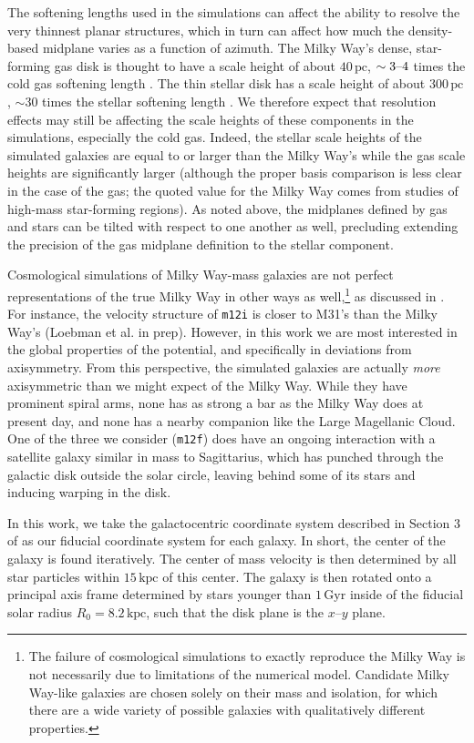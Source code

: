 \documentclass[twocolumn]{aastex62}
\newcommand{\pc}{\text{pc}}
\newcommand{\kpc}{\text{kpc}}
\newcommand{\Gyr}{\text{Gyr}}
\newcommand{\mi}{\texttt{m12i}}
\newcommand{\mf}{\texttt{m12f}}
\begin{document}
The softening lengths used in the simulations can affect the ability to
resolve the very thinnest planar structures, which in turn can affect how much
the density-based midplane varies as a function of azimuth. The Milky Way's
dense, star-forming gas disk is thought to have a scale height of about
$40\,\pc$, $\sim3\textup{--}4$ times the cold gas softening length
\citep{2019ApJ...871..145A}. The thin stellar disk has a scale height of about
$300\,\pc$, $\sim30$ times the stellar softening length
\citep{2008ApJ...673..864J}. We therefore expect that resolution effects may
still be affecting the scale heights of these components in the simulations,
especially the cold gas. Indeed, the stellar scale heights of the simulated
galaxies are equal to or larger than the Milky Way's while the gas scale
heights are significantly larger (although the proper basis comparison is less
clear in the case of the gas; the quoted value for the Milky Way comes from
studies of high-mass star-forming regions). As noted above, the midplanes
defined by gas and stars can be tilted with respect to one another as well,
precluding extending the precision of the gas midplane definition to the
stellar component.

Cosmological simulations of Milky Way-mass galaxies are not perfect
representations of the true Milky Way in other ways as well,\footnote{The
failure of cosmological simulations to exactly reproduce the Milky Way is not necessarily due to limitations of the numerical model. Candidate Milky Way-like
galaxies are chosen solely on their mass and isolation, for which there are a
wide variety of possible galaxies with qualitatively different properties.} as
discussed in \citet{2018arXiv180610564S}. For instance, the velocity structure
of \mi{} is closer to M31's than the Milky Way's (Loebman et al. in prep).
However, in this work we are most interested in the global properties of the
potential, and specifically in deviations from axisymmetry. From this
perspective, the simulated galaxies are actually \emph{more} axisymmetric than
we might expect of the Milky Way. While they have prominent spiral arms, none
has as strong a bar as the Milky Way does at present day, and none has a
nearby companion like the Large Magellanic Cloud. One of the three we consider
(\mf) does have an ongoing interaction with a satellite galaxy similar in mass to
Sagittarius, which has punched through the galactic disk outside the solar
circle, leaving behind some of its stars and inducing warping in the disk.

In this work, we take the galactocentric coordinate system described in
Section 3 of \citet{2018arXiv180610564S} as our fiducial coordinate system for
each galaxy. In short, the center of the galaxy is found iteratively. The
center of mass velocity is then determined by all star particles within
$15\,\kpc$ of this center. The galaxy is then rotated onto a principal axis
frame determined by stars younger than $1\,\Gyr$ inside of the fiducial solar
radius $R_{0} = 8.2\,\kpc$, such that the disk plane is the $x$--$y$ plane.
\end{document}
